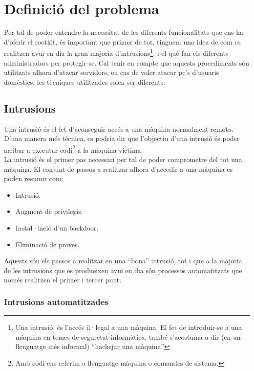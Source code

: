 \chapter{Definició del problema}

Per tal de poder entendre la necessitat de les diferents funcionalitats que ens ha d'oferir el rootkit,
és important que primer de tot, tinguem una idea de com es realitzen avui en dia la gran majoria
d'intrusions\footnote{Una intrusió, és l'accés il·legal a una màquina. El fet de introduir-se a una màquina
en temes de seguretat informàtica, també s'acostuma a dir (en un llenguatge més informal) ``hackejar una màquina''},
i el què fan els diferents administradors per protegir-se. Cal tenir en compte que aquests procediments són 
utilitzats alhora d'atacar servidors, en cas de voler atacar pc's d'usuaris domèstics, les tècniques utilitzades 
solen ser diferents.

\section{Intrusions}

Una intrusió és el fet d'aconseguir accés a una màquina normalment remota. D'una manera més tècnica, es podria dir
que l'objectiu d'una intrusió és poder arribar a executar codi\footnote{Amb codi ens referim a llenguatge màquina o comandes de sistema.} 
a la màquina víctima. \\

La intrusió és el primer pas necessari per tal de poder comprometre del tot una màquina. El conjunt de passos a 
realitzar alhora d'accedir a una màquina es poden resumir com:

\begin{itemize}
\item Intrusió.
\item Augment de privilegis.
\item Instal·lació d'un backdoor.
\item Eliminació de proves.
\end{itemize}

Aquests són els passos a realitzar en una ``bona'' intrusió, tot i que a la majoria de les intrusions que es produeixen
avui en dia són processos automatitzats que només realitzen el primer i tercer punt.

\subsection{Intrusions automatitzades} 

